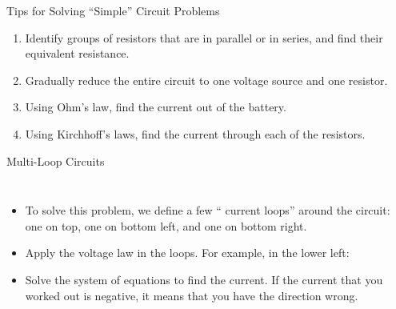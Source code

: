 \documentclass[12pt,aspectratio=169]{beamer}
\newcommand{\eq}[2]{\vspace{#1}{\Large\begin{displaymath}#2\end{displaymath}}}
\begin{document}
\begin{frame}{Tips for Solving ``Simple'' Circuit Problems}
  \begin{enumerate}
  \item Identify groups of resistors that are in parallel or in series, and
    find their equivalent resistance.
  \item Gradually reduce the entire circuit to one voltage source and one
    resistor.
  \item Using Ohm's law, find the current out of the battery.
  \item Using Kirchhoff's laws, find the current through each of the resistors.
  \end{enumerate}
\end{frame}



\begin{frame}{Multi-Loop Circuits}
  \begin{columns}
   
    \begin{itemize}
    \item To solve this problem, we define a few `` current loops'' around the
      circuit: one on top, one on bottom left, and one on bottom right.
    \item<2-> Apply the voltage law in the loops. For example, in the
      lower left:

      \eq{-.5in}{
        4(I_1-I_3)-6-6I_3=0
      }      
    \item<2->\vspace{-.1in} Solve the system of equations to find the current.
      If the current that you worked out is negative, it means that you have the
      direction wrong.
    \end{itemize}
  \end{columns}
\end{frame}
\end{document}
